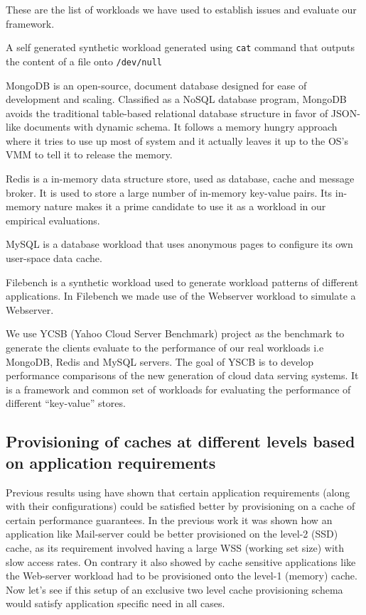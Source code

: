 	These are the list of workloads we have used to establish issues and evaluate our framework.
	  
	    A self generated synthetic workload generated using \texttt{cat} command that outputs the 
	    content of a file onto \texttt{/dev/null}
	  
	    MongoDB \cite{Mongodb} is an open-source, document database designed for ease of development and scaling. Classified as a NoSQL 
    database program, MongoDB avoids the traditional table-based relational database structure in favor of JSON-like documents with dynamic 
    schema. It follows a memory hungry approach where it tries to use up most of system and it actually leaves it up to the OS's VMM to tell it 
    to release the memory.

	    Redis \cite{redis} is a in-memory data structure store, used as database, cache and message broker. It is used to store a large 
    number of in-memory key-value pairs. Its in-memory nature makes it a prime candidate to use it as a workload in our empirical evaluations.
      
	    MySQL \cite{mysql} is a database workload that uses anonymous pages to configure its own user-space data cache. 
	    
	    Filebench \cite{filebench} is a synthetic workload used to generate workload patterns of different applications. In 
	    Filebench we made use of the Webserver workload to simulate a Webserver.
	  
      
	    We use YCSB \cite{cooper2010benchmarking} (Yahoo Cloud Server Benchmark) project as the benchmark to generate the clients evaluate 
    to the performance of our real workloads i.e MongoDB, Redis and MySQL servers. The goal of YSCB is to develop performance comparisons of the new 
    generation of cloud data serving systems. It is a framework and common set of workloads for evaluating the performance of different 
    “key-value” stores.
  
    \subsection{Provisioning of caches at different levels based on application requirements}    
      Previous results using \dd{}\cite{doubledecker} have shown that certain application requirements 
      (along with their configurations) could be satisfied better by provisioning on a cache of certain 
      performance guarantees. In the previous work\cite{doubledecker} it was shown how an application like 
      Mail-server could be better provisioned on the level-2 (SSD) cache, as its requirement involved 
      having a large WSS (working set size) with slow access rates. On contrary it also showed by cache sensitive 
      applications like the Web-server workload had to be provisioned onto the level-1 (memory) cache. 
      Now let's see if this setup of an exclusive two level cache provisioning schema would satisfy application
      specific need in all cases.
	
